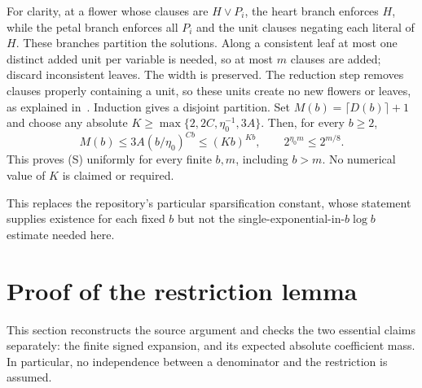 \documentclass[11pt]{article}
\begin{document}
For clarity, at a flower whose clauses are $H\vee P_i$, the heart branch
enforces $H$, while the petal branch enforces all $P_i$ and the unit clauses
negating each literal of $H$. These branches partition the solutions.
Along a consistent leaf at most one distinct added unit per variable is
needed, so at most $m$ clauses are added; discard inconsistent leaves.
The width is preserved. The reduction step removes clauses properly
containing a unit, so these units create no new flowers or leaves, as
explained in~\cite[Appendix~A]{DHMTW}. Induction gives a disjoint partition.
Set $M(b)=\lceil D(b)\rceil+1$ and choose any absolute
$K\ge\max\{2,2C,\eta_0^{-1},3A\}$. Then, for every $b\ge2$,
\[
 M(b)\le3A(b/\eta_0)^{Cb}\le(Kb)^{Kb},\qquad
 2^{\eta_0m}\le2^{m/8}.
\]
This proves (S) uniformly for every finite $b,m$, including $b>m$.
No numerical value of $K$ is claimed or required.

This replaces the repository's particular sparsification constant,
whose statement supplies existence for each fixed $b$ but not the
single-exponential-in-$b\log b$ estimate needed here.

\section{Proof of the restriction lemma}

This section reconstructs the source argument and checks the two essential
claims separately: the finite signed expansion, and its expected absolute
coefficient mass. In particular, no independence between a denominator and
the restriction is assumed.
\end{document}
